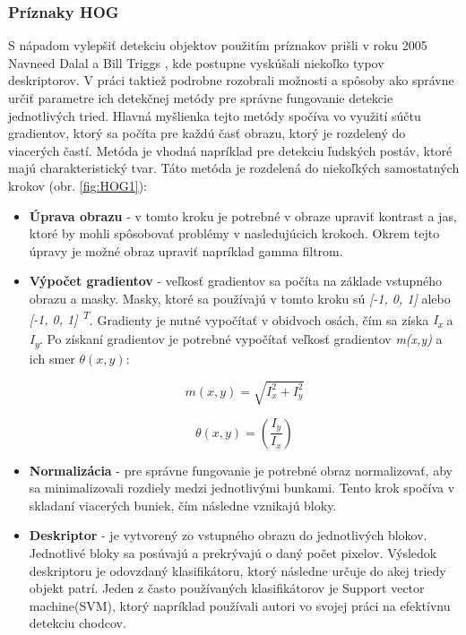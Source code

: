\documentclass[slovak,master,dept460,male,cpp,cpdeclaration]{diploma}
\begin{document}
\subsubsection*{Príznaky HOG}
\label{HOG}
S nápadom  vylepšiť detekciu objektov použitím príznakov prišli v roku 2005 Navneed Dalal a Bill Triggs \cite{dalal2005}, kde postupne vyskúšali niekoľko typov deskriptorov.  V práci taktiež podrobne rozobrali  možnosti a spôsoby ako správne určiť parametre ich detekčnej metódy pre správne fungovanie detekcie jednotlivých tried. Hlavná myšlienka tejto metódy spočíva vo využití súčtu gradientov, ktorý sa počíta pre  každú časť obrazu, ktorý je rozdelený do viacerých častí. Metóda je vhodná napríklad pre detekciu ľudských postáv, ktoré majú charakteristický tvar. Táto metóda je rozdelená do niekoľkých samostatných krokov (obr. \ref{fig:HOG1}):
\begin{itemize}
  \item \textbf{Úprava obrazu} - v tomto kroku je potrebné  v obraze upraviť kontrast a jas, ktoré by mohli spôsobovať  problémy v nasledujúcich krokoch. Okrem tejto úpravy  je možné obraz upraviť napríklad gamma filtrom.
  \item \textbf{Výpočet gradientov} - veľkosť gradientov sa počíta na základe vstupného obrazu a masky. Masky, ktoré sa používajú v tomto kroku sú \textit{[-1, 0, 1]} alebo \textit{[-1, 0, 1] \textsuperscript{T}}. Gradienty je nutné vypočítať v obidvoch osách, čím sa získa \textit{I\textsubscript{x}} a \textit{I\textsubscript{y}}. Po získaní gradientov je potrebné vypočítať veľkosť gradientov \textit{m(x,y)} a ich smer \textit{$\theta(x, y)$}:
  
\begin{equation}
m(x,y)= \sqrt{I_{x}^{2} + I_{y}^{2}}
\label{eq:Výpočet veľkosti gradientu}
\end{equation}

  \begin{equation}
\theta(x, y) = \left(\frac{I_{y}}{I_{x}}\right)
\label{eq:Výpočet smeru gradientu}
\end{equation}
  \item \textbf{Normalizácia} -  pre správne fungovanie je potrebné obraz normalizovať, aby sa minimalizovali rozdiely medzi jednotlivými bunkami. Tento krok spočíva v skladaní viacerých buniek, čím následne vznikajú bloky. 
   \item \textbf{Deskriptor} -  je vytvorený zo vstupného obrazu do jednotlivých blokov. Jednotlivé bloky sa posúvajú a prekrývajú o daný počet pixelov. Výsledok deskriptoru je odovzdaný  klasifikátoru, ktorý následne určuje do akej triedy objekt patrí. Jeden z často používaných klasifikátorov je Support vector machine(SVM), ktorý napríklad používali autori vo svojej práci na efektívnu detekciu chodcov\cite{pang2011efficient}.
 \end{itemize}
\end{document}
